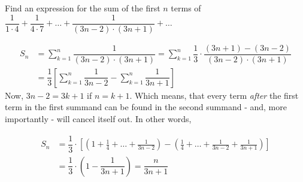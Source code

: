 

\question[3] Find an expression for the sum of the first $n$ terms of 
$\dfrac{1}{1\cdot 4} + \dfrac{1}{4\cdot 7} + \ldots + \dfrac{1}{(3n-2)\cdot(3n+1)} + \ldots$


\ifprintanswers
\fi 

\begin{solution}[\halfpage]
	\begin{align}
		S_n &= \sum_{k=1}^{n}\dfrac{1}{(3n-2)\cdot(3n+1)} = 
		\sum_{k=1}^{n}\dfrac{1}{3}\cdot\dfrac{(3n+1) - (3n-2)}{(3n-2)\cdot(3n+1)} \\
		&= \dfrac{1}{3}\left[ \sum_{k=1}^{n}\dfrac{1}{3n-2} - \sum_{k=1}^{n}\dfrac{1}{3n+1}\right]
	\end{align}
	Now, $3n-2 = 3k + 1$ if $n = k + 1$. Which means, that every term \textit{after} the first
	term in the first summand can be found in the second summand - and, more importantly - will 
	cancel itself out. In other words,
	
	\begin{align}
		S_n &= \dfrac{1}{3}\cdot\left[\left( 1+\frac{1}{4}+\ldots +\frac{1}{3n-2}\right)
		- \left( \frac{1}{4} + \ldots + \frac{1}{3n-2} + \frac{1}{3n+1}\right) \right] \\
		&= \dfrac{1}{3}\cdot\left( 1-\dfrac{1}{3n+1}\right) = \dfrac{n}{3n+1}
	\end{align}
\end{solution}
